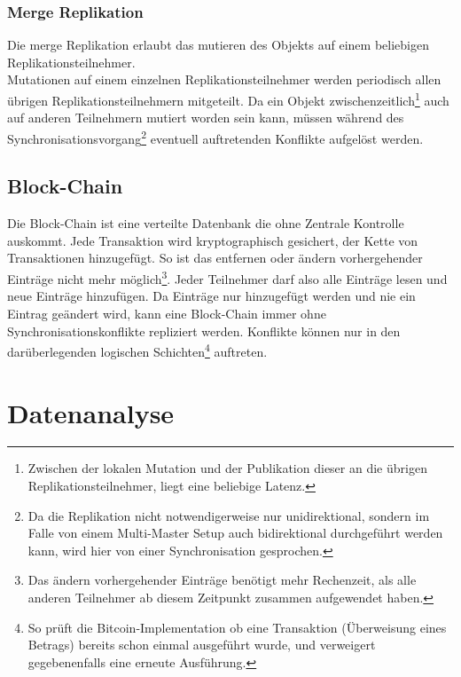 \documentclass[oneside,11pt,parskip=half,ngerman]{scrreprt}
\begin{document}
\subsubsection{Merge Replikation}\label{merge-replikation}

Die merge Replikation erlaubt das mutieren des Objekts auf einem
beliebigen Replikationsteilnehmer.\\Mutationen auf einem einzelnen
Replikationsteilnehmer werden periodisch allen übrigen
Replikationsteilnehmern mitgeteilt. Da ein Objekt
zwischenzeitlich\footnote{Zwischen der lokalen Mutation und der
  Publikation dieser an die übrigen Replikationsteilnehmer, liegt eine
  beliebige Latenz.} auch auf anderen Teilnehmern mutiert worden sein
kann, müssen während des Synchronisationsvorgang\footnote{Da die
  Replikation nicht notwendigerweise nur unidirektional, sondern im
  Falle von einem Multi-Master Setup auch bidirektional durchgeführt
  werden kann, wird hier von einer Synchronisation gesprochen.}
eventuell auftretenden Konflikte aufgelöst werden.

\subsection{Block-Chain}\label{block-chain}

Die Block-Chain ist eine verteilte Datenbank die ohne Zentrale Kontrolle
auskommt. Jede Transaktion wird kryptographisch gesichert, der Kette von
Transaktionen hinzugefügt. So ist das entfernen oder ändern
vorhergehender Einträge nicht mehr möglich\footnote{Das ändern
  vorhergehender Einträge benötigt mehr Rechenzeit, als alle anderen
  Teilnehmer ab diesem Zeitpunkt zusammen aufgewendet haben.}. Jeder
Teilnehmer darf also alle Einträge lesen und neue Einträge hinzufügen.
Da Einträge nur hinzugefügt werden und nie ein Eintrag geändert wird,
kann eine Block-Chain immer ohne Synchronisationskonflikte repliziert
werden. Konflikte können nur in den darüberlegenden logischen
Schichten\footnote{So prüft die Bitcoin-Implementation ob eine
  Transaktion (Überweisung eines Betrags) bereits schon einmal
  ausgeführt wurde, und verweigert gegebenenfalls eine erneute
  Ausführung.} auftreten. \autocite{block-chain}


\section{Datenanalyse}\label{datenanalyse}
\end{document}
